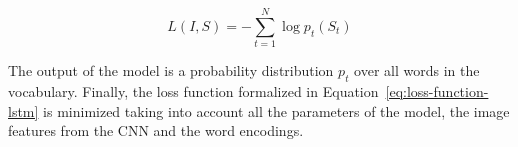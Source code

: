 \begin{equation}\label{eq:loss-function-lstm}
	L(I,S)=-\sum\limits_{t=1}^{N}\log p_t(S_t)
\end{equation}

The output of the model is a probability distribution $p_t$ over all words in the vocabulary. Finally, the loss function formalized in Equation~\ref{eq:loss-function-lstm} is minimized taking into account all the parameters of the model, the image features from the CNN and the word encodings.
